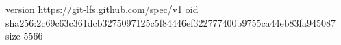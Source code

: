 version https://git-lfs.github.com/spec/v1
oid sha256:2c69c63c361dcb3275097125c5f84446ef322777400b9755ca44eb83fa945087
size 5566

